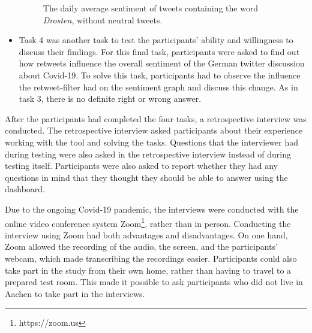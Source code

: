 \begin{itemize}
\begin{figure}[htb]
        \caption{The daily average sentiment of tweets containing the word \emph{Drosten}, without neutral tweets.}
        \label{fig:sentiment_drosten_noneutral}
    \end{figure}
    \item Task 4 was another task to test the participants' ability and willingness to discuss their findings. For this final task, participants were asked to find out how retweets influence the overall sentiment of the German twitter discussion about Covid-19. To solve this task, participants had to observe the influence the retweet-filter had on the sentiment graph and discuss this change. As in task 3, there is no definite right or wrong answer.
\end{itemize}

After the participants had completed the four tasks, a retrospective interview was conducted. The retrospective interview asked participants about their experience working with the tool and solving the tasks. Questions that the interviewer had during testing were also asked in the retrospective interview instead of during testing itself. Participants were also asked to report whether they had any questions in mind that they thought they should be able to answer using the dashboard.

Due to the ongoing Covid-19 pandemic, the interviews were conducted with the online video conference system Zoom\footnote{https://zoom.us}, rather than in person. Conducting the interview using Zoom had both advantages and disadvantages. On one hand, Zoom allowed the recording of the audio, the screen, and the participants' webcam, which made transcribing the recordings easier. Participants could also take part in the study from their own home, rather than having to travel to a prepared test room. This made it possible to ask participants who did not live in Aachen to take part in the interviews.

